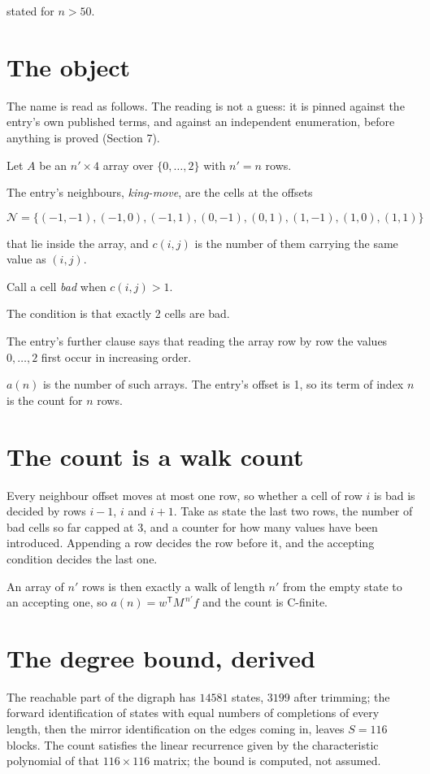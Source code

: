 \documentclass[11pt]{article}
\theoremstyle{definition}
\begin{document}
stated for $n > 50$.

\section{The object}

The name is read as follows. The reading is not a guess: it is pinned against the entry's own published terms, and against an independent enumeration, before anything is proved (Section 7).

Let $A$ be an $n' \times 4$ array over $\{0,\dots,2\}$ with $n' = n$ rows.

The entry's neighbours, {\itshape king-move}, are the cells at the offsets

\[\mathcal{N} = \{(-1,-1), (-1,0), (-1,1), (0,-1), (0,1), (1,-1), (1,0), (1,1)\}\]

that lie inside the array, and $c(i,j)$ is the number of them carrying the same value as $(i,j)$.

Call a cell {\itshape bad} when $c(i,j) > 1$.

The condition is that exactly 2 cells are bad.

The entry's further clause says that reading the array row by row the values $0,\dots,2$ first occur in increasing order.

$a(n)$ is the number of such arrays. The entry's offset is 1, so its term of index $n$ is the count for $n$ rows.

\section{The count is a walk count}

Every neighbour offset moves at most one row, so whether a cell of row $i$ is bad is decided by rows $i-1$, $i$ and $i+1$. Take as state the last two rows, the number of bad cells so far capped at 3, and a counter for how many values have been introduced. Appending a row decides the row before it, and the accepting condition decides the last one.

An array of $n'$ rows is then exactly a walk of length $n'$ from the empty state to an accepting one, so $a(n) = w^{\mathsf T}M^{\,n'}f$ and the count is C-finite.

\section{The degree bound, derived}

The reachable part of the digraph has $14581$ states, $3199$ after trimming; the forward identification of states with equal numbers of completions of every length, then the mirror identification on the edges coming in, leaves $S = 116$ blocks. The count satisfies the linear recurrence given by the characteristic polynomial of that $116\times116$ matrix; the bound is computed, not assumed.
\end{document}

